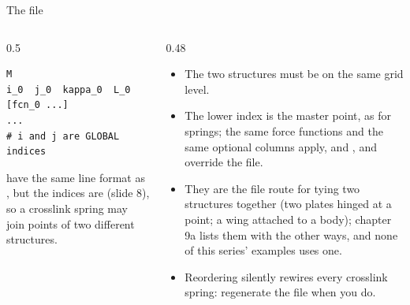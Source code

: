 \documentclass[aspectratio=169,11pt]{beamer}
\begin{document}
\begin{frame}[fragile]{The  file}
\begin{columns}[T,onlytextwidth]
\begin{column}{0.5\textwidth}
\begin{lstlisting}[style=data]
M
i_0  j_0  kappa_0  L_0  [fcn_0 ...]
...
# i and j are GLOBAL indices
\end{lstlisting}
\small {} have the same line format as , but the indices are  (slide 8), so a crosslink spring may join points of two different structures.
\end{column}
\begin{column}{0.48\textwidth}
\footnotesize
\begin{itemize}
  \item The two structures must be on the same grid level.
  \item The lower index is the master point, as for springs; the same force functions and the same optional columns apply, and ,  and  override the file.
  \item They are the file route for tying two structures together (two plates hinged at a point; a wing attached to a body); chapter 9a lists them with the other ways, and none of this series' examples uses one.
  \item Reordering  silently rewires every crosslink spring: regenerate the file when you do.
\end{itemize}
\end{column}
\end{columns}
\end{frame}
\end{document}
